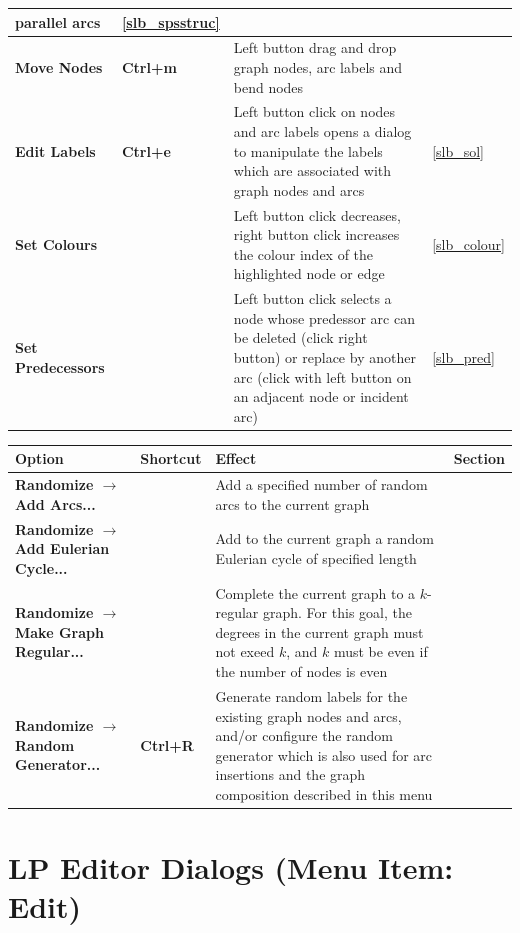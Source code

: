 \documentclass[a4paper,11pt,twoside]{book}
\begin{document}
\begin{tabular}{p{7.5cm}|p{2cm}|p{13.5cm}|p{1.5cm}}
    parallel arcs &
    \ref{slb_spsstruc} \\ \hline
\bf Move Nodes &\bf Ctrl+m &
    Left button drag and drop graph nodes, arc labels and bend nodes \\ \hline
\bf Edit Labels &\bf Ctrl+e &
    Left button click on nodes and arc labels opens a dialog to manipulate the
    labels which are associated with graph nodes and arcs &
    \ref{slb_sol} \\ \hline
\bf Set Colours & &
    Left button click decreases, right button click increases the colour index
    of the highlighted node or edge &
    \ref{slb_colour} \\ \hline
\bf Set Predecessors & &
    Left button click selects a node whose predessor arc can be deleted (click
    right button) or replace by another arc (click with left button on an
    adjacent node or incident arc) &
    \ref{slb_pred} \\ \hline
\end{tabular}


\vfill
\clearpage
\noindent
\begin{tabular}{p{7.5cm}|p{2cm}|p{13.5cm}|p{1.5cm}} 
\large\bf Option &  \large\bf Shortcut & \large\bf Effect & \large\bf Section \\
[1mm] \hline \hline
\bf Randomize $\rightarrow$ Add Arcs... & &
    Add a specified number of random arcs to the current graph \\ \hline
\bf Randomize $\rightarrow$ Add Eulerian Cycle... & &
    Add to the current graph a random Eulerian cycle of specified length \\ \hline
\bf Randomize $\rightarrow$ Make Graph Regular... & &
    Complete the current graph to a $k$-regular graph. For this goal, the degrees
    in the current graph must not exeed $k$, and $k$ must be even if the number of
    nodes is even \\ \hline
\bf Randomize $\rightarrow$ Random Generator... &\bf Ctrl+R &
    Generate random labels for the existing graph nodes and arcs, and/or configure
    the random generator which is also used for arc insertions and the graph
    composition described in this menu
\end{tabular}


\vfill
\section{LP Editor Dialogs (Menu Item: Edit)}
\end{document}

